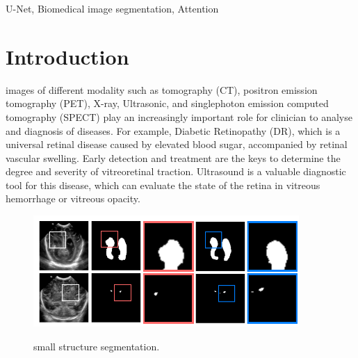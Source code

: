 \documentclass{ieeeaccess}
\begin{document}
\begin{keywords}
U-Net, Biomedical image segmentation, Attention
\end{keywords}

\titlepgskip=-15pt

\maketitle

\section{Introduction}
\label{sec:introduction}
  images of different modality such as tomography (CT), positron emission tomography (PET), X-ray, Ultrasonic, and singlephoton emission computed tomography (SPECT) play an increasingly important role for clinician to analyse and diagnosis of diseases. For example, Diabetic Retinopathy (DR), which  is a universal retinal disease caused by elevated blood sugar, accompanied by retinal vascular swelling. Early detection and treatment are the keys to determine the degree and severity of vitreoretinal traction. Ultrasound is a valuable diagnostic tool for this disease, which can evaluate the state of the retina in vitreous hemorrhage or vitreous opacity.

\begin{figure}[htbp]
  \xdef\xfigwd{\textwidth}%
  \centering
  \includegraphics[width=0.9\textwidth]{figure/segment_small_structures.png}
  \label{fig:segment_small_structures}
  \caption{small structure segmentation.}

\end{figure}
\end{document}
